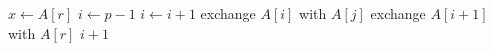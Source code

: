 \begin{algorithm}
\caption{Partition}
\begin{algorithmic}
  \STATE $x \gets A[r]$
  \STATE $i \gets p - 1$
      \STATE $i \gets i + 1$
      \STATE exchange $A[i]$ with $A[j]$
    \ENDIF
  \ENDFOR
  \STATE exchange $A[i + 1]$ with $A[r]$
  \RETURN $i + 1$
\ENDPROCEDURE
\end{algorithmic}
\end{algorithm}
